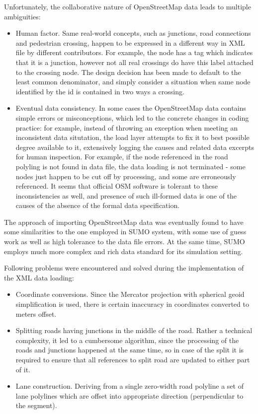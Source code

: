 Unfortunately, the collaborative nature of OpenStreetMap data leads to multiple ambiguities:
\begin{itemize}
    \item Human factor. Same real-world concepts, such as junctions, road connections and pedestrian crossing, happen to be expressed in a different way in XML file by different contributors. For example, the node has a tag which indicates that it is a junction, however not all real crossings do have this label attached to the crossing node. The design decision has been made to default to the least common denominator, and simply consider a situation when same node identified by the id is contained in two ways a crossing.
    \item Eventual data consistency. In some cases the OpenStreetMap data contains simple errors or misconceptions, which led to the concrete changes in coding practice: for example, instead of throwing an exception when meeting an inconsistent data situtation, the load layer attempts to fix it to best possible degree available to it, extensively logging the causes and related data excerpts for human inspection. For example, if the node referenced in the road polyling is not found in data file, the data loading is not terminated - some nodes just happen to be cut off by processing, and some are erroneously referenced. It seems that official OSM software is tolerant to these inconsistencies as well, and presence of such ill-formed data is one of the causes of the absence of the formal data specification.
\end{itemize}

The approach of importing OpenStreetMap data was eventually found to have some similarities to the one employed in SUMO system, with some use of guess work as well as high tolerance to the data file errors. At the same time, SUMO employs much more complex and rich data standard for its simulation setting.

Following problems were encountered and solved during the implementation of the XML data loading:
\begin{itemize}
    \item Coordinate conversions. Since the Mercator projection with spherical geoid simplification is used, there is certain inaccuracy in coordinates converted to meters offset.
    \item Splitting roads having junctions in the middle of the road. Rather a technical complexity, it led to a cumbersome algorithm, since the processing of the roads and junctions happened at the same time, so in case of the split it is required to ensure that all references to split road are updated to either part of it.
    \item Lane construction. Deriving from a single zero-width road polyline a set of lane polylines which are offset into appropriate direction (perpendicular to the segment).
\end{itemize}

